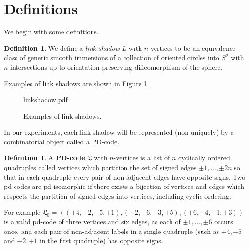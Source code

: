 \documentclass[amsmath,secnumarabic,floatfix,amssymb,nofootinbib,nobibnotes,letterpaper,11pt,tightenlines,showkeys]{revtex4}
\theoremstyle{definition}
\newtheorem{definition}[theorem]{Definition}
\let\mgp=\marginpar \marginparwidth18mm \marginparsep1mm
\def\marginpar#1{\mgp{\raggedright\tiny #1}}
\let\lbl=\label
\def\label#1{\lbl{#1}\ifinner\else\marginpar{\ref{#1} #1}\ignorespaces\fi}
\begin{document}
\section{Definitions}

We begin with some definitions.
\begin{definition}
We define a \emph{link shadow} $L$ with $n$ vertices to be an equivalence class of generic smooth immersions of a collection of oriented circles into $S^2$ with $n$ intersections up to orientation-preserving diffeomorphism of the sphere.
\end{definition}
Examples of link shadows are shown in Figure \ref{fig:ShadowExamples}.
\begin{figure}
	\begin{overpic}[width=4in]{linkshadow.pdf}
	\end{overpic}
	\caption{\label{fig:ShadowExamples}Examples of link shadows.}
\end{figure}
In our experiments, each link shadow will be represented (non-uniquely) by a combinatorial object called a PD-code. 
\begin{definition}\label{def:PD}
A \textbf{PD-code} $\mathfrak{L}$ with $n$-vertices is a list of $n$ cyclically ordered quadruples called vertices which partition the set of signed edges $\pm 1,\dots, \pm 2n$ so that in each quadruple every pair of non-adjacent edges have opposite signs. Two pd-codes are pd-isomorphic if there exists a bijection of vertices and edges which respects the partition of signed edges into vertices, including cyclic ordering.
\end{definition}
For example $\mathfrak{L}_0 = ((+4,-2,-5,+1),(+2,-6,-3,+5),(+6,-4,-1,+3))$ is a valid pd-code of three vertices and six edges, as each of $\pm 1, \dots, \pm 6$ occurs once, and each pair of non-adjacent labels in a single quadruple (such as $+4,-5$ and $-2,+1$ in the first quadruple) has opposite signs. 
\end{document}

